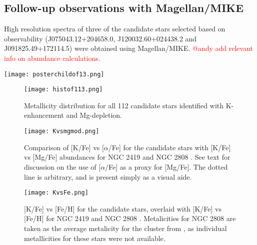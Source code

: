 \documentclass[a4paper,fleqn,usenatbib]{mnras}
\newcommand{\todo}[1]{\textcolor{red}{#1}}
\newcommand{\project}[1]{#1}
\newcommand{\lamost}{\project{LAMOST}}
\newcommand{\tc}{\project{The Cannon}}
\begin{document}


\subsection{Follow-up observations with Magellan/MIKE}
High resolution spectra of three of the candidate stars selected based on observability (J075043.12+204658.0, J120032.60+024438.2 and J091825.49+172114.5) were obtained using Magellan/MIKE. \todo{@andy add relevant info on abundance calculations.}


\begin{figure*}
	\texttt{[image: posterchildof13.png]}
    \caption{Pseudo-continuum-normalised \lamost\ spectra for the Mg-depleted and K-enhanced candidate J034458.82+592955.1. The data  are shown in black and the best-fitting data-driven model from \tc\ is shown in red. We show zoom-in axes around the magnesium triplet and potassium doublet, which we used to identify Mg-K candidates. Note that $[\alpha/{\rm Fe}]$ is a label in \tc\ model used, and J034458.82+592955.1 shows Mg depletions relative to the estimated [$\alpha$/Fe] value.}
    \label{posterchild}
\end{figure*}

\begin{figure}
	\texttt{[image: histof113.png]}
    \caption{Metallicity distribution for all 112 candidate stars identified with K-enhancement and Mg-depletion.}
    \label{mhist}
\end{figure}

\begin{figure}
	\texttt{[image: Kvsmgmod.png]}
    \caption{Comparison of [K/Fe] vs [$\alpha$/Fe] for the candidate stars with [K/Fe] vs [Mg/Fe] abundances for NGC 2419 and NGC 2808 \citep{cohenkirby2012, mucciarelli2012, mucciarelli2015}. See text for discussion on the use of [$\alpha$/Fe] as a proxy for [Mg/Fe]. The dotted line is arbitrary, and is present simply as a visual aide.}
    \label{KvsMg}
\end{figure}

\begin{figure}
	\texttt{[image: KvsFe.png]}
    \caption{[K/Fe] vs [Fe/H] for the candidate stars, overlaid with [K/Fe] vs [Fe/H] for NGC 2419 and NGC 2808 \citep{cohenkirby2012, mucciarelli2012, mucciarelli2015}. Metalicities for NGC 2808 are taken as the average metalicity for the cluster from \citet{harris1996}, as individual metallicities for these stars were not available.}
    \label{KvsFe}
\end{figure}
\end{document}
